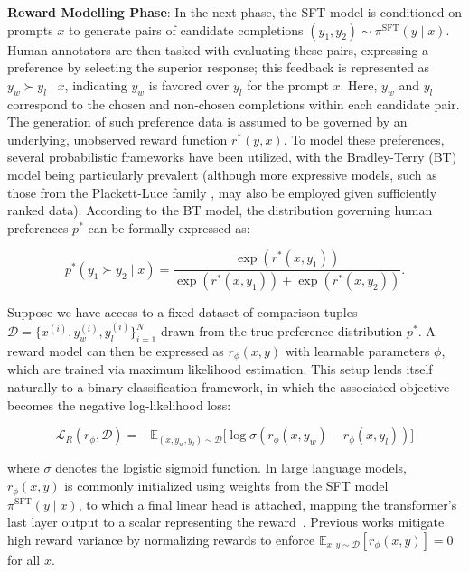 \textbf{Reward Modelling Phase}: In the next phase, the SFT model is conditioned on prompts $x$ to generate pairs of candidate completions $(y_1, y_2)\sim \pi^\text{SFT}(y \mid x)$. Human annotators are then tasked with evaluating these pairs, expressing a preference by selecting the superior response; this feedback is represented as $y_w\succ y_l \mid x$, indicating $y_w$ is favored over $y_l$ for the prompt $x$. Here, $y_w$ and $y_l$ correspond to the chosen and non-chosen completions within each candidate pair. The generation of such preference data is assumed to be governed by an underlying, unobserved reward function $r^*(y, x)$. To model these preferences, several probabilistic frameworks have been utilized, with the Bradley-Terry (BT) model \cite{bradley1952rankanalysis} being particularly prevalent (although more expressive models, such as those from the Plackett-Luce family \citep{plackett1975analysis, luce2012individual}, may also be employed given sufficiently ranked data). According to the BT model, the distribution governing human preferences $p^*$ can be formally expressed as:

\begin{equation}\label{eq:bradley-terry}
    p^*(y_1\succ y_2 \mid x)=\frac{\exp\left(r^*(x, y_1)\right)}{\exp\left(r^*(x, y_1)\right) + \exp\left(r^*(x, y_2)\right)}.
\end{equation}

Suppose we have access to a fixed dataset of comparison tuples $\mathcal{D}=\bigl\{x^{(i)}, y_w^{(i)}, y_l^{(i)}\bigr\}_{i=1}^N$ drawn from the true preference distribution $p^*$. A reward model can then be expressed as $r_{\phi}(x, y)$ with learnable parameters $\phi$, which are trained via maximum likelihood estimation. This setup lends itself naturally to a binary classification framework, in which the associated objective becomes the negative log-likelihood loss:

\begin{equation}\label{eq:reward_model}
    \mathcal{L}_R(r_{\phi}, \mathcal{D}) = -\mathbb{E}_{(x, y_w, y_l)\sim \mathcal{D}}\bigl[\log \sigma(r_{\phi}(x, y_w)- r_{\phi}(x, y_l))\bigr]
\end{equation}

where $\sigma$ denotes the logistic sigmoid function. In large language models, $r_{\phi}(x, y)$ is commonly initialized using weights from the SFT model $\pi^\text{SFT}(y \mid x)$, to which a final linear head is attached, mapping the transformer's last layer output to a scalar representing the reward~\cite{ziegler2020finetuning}. Previous works mitigate high reward variance by normalizing rewards to enforce $\mathbb{E}_{x,y\sim \mathcal{D}}\left[r_\phi(x, y)\right] = 0$ for all $x$.

